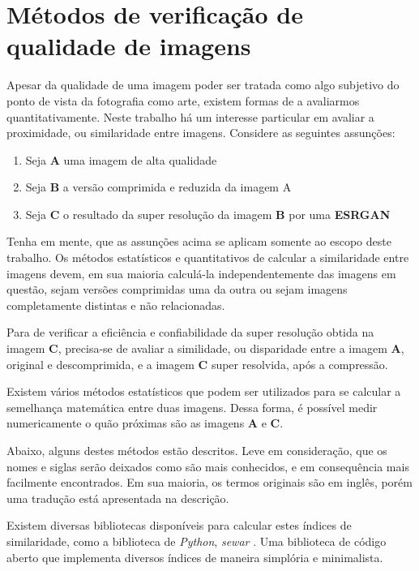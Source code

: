 \section{Métodos de verificação de qualidade de imagens}
\label{sec:qualidade-imagem}

Apesar da qualidade de uma imagem poder ser tratada como algo subjetivo do ponto de vista da fotografia como arte, existem formas de a avaliarmos quantitativamente. Neste trabalho há um interesse particular em avaliar a proximidade, ou similaridade entre imagens. Considere as seguintes assunções:

\begin{enumerate}
    \item Seja \textbf{A} uma imagem de alta qualidade
    \item Seja \textbf{B} a versão comprimida e reduzida da imagem A
    \item Seja \textbf{C} o resultado da super resolução da imagem \textbf{B} por uma \textbf{ESRGAN}
\end{enumerate}

Tenha em mente, que as assunções acima se aplicam somente ao escopo deste trabalho. Os métodos estatísticos e quantitativos de calcular a similaridade entre imagens devem, em sua maioria calculá-la independentemente das imagens em questão, sejam versões comprimidas uma da outra ou sejam imagens completamente distintas e não relacionadas.

Para de verificar a eficiência e confiabilidade da super resolução obtida na imagem \textbf{C}, precisa-se de avaliar a similidade, ou disparidade entre a imagem \textbf{A}, original e descomprimida, e a imagem \textbf{C} super resolvida, após a compressão.

Existem vários métodos estatísticos que podem ser utilizados para se calcular a semelhança matemática entre duas imagens. Dessa forma, é possível medir numericamente o quão próximas são as imagens \textbf{A} e \textbf{C}.

Abaixo, alguns destes métodos estão descritos. Leve em consideração, que os nomes e siglas serão deixados como são mais conhecidos, e em consequência mais facilmente encontrados. Em sua maioria, os termos originais são em inglês, porém uma tradução está apresentada na descrição.

Existem diversas bibliotecas disponíveis para calcular estes índices de similaridade, como a biblioteca de \textit{Python}, \textit{sewar} \cite{khalel_sewar_2023}. Uma biblioteca de código aberto que implementa diversos índices de maneira simplória e minimalista.


